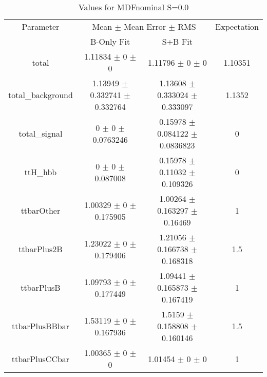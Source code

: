\begin{table}
\centering
\caption{Values for MDFnominal S=0.0}
\begin{tabular}{cccc}
\toprule
Parameter & \multicolumn{2}{c}{Mean $\pm$ Mean Error $\pm$ RMS} & Expectation\\
 & B-Only Fit & S+B Fit & \\
\midrule
total & \num{1.11834} $\pm$ \num{0} $\pm$ \num{0} & \num{1.11796} $\pm$ \num{0} $\pm$ \num{0} & \num{1.10351}\\
total\_background & \num{1.13949} $\pm$ \num{0.332741} $\pm$ \num{0.332764} & \num{1.13608} $\pm$ \num{0.333024} $\pm$ \num{0.333097} & \num{1.1352}\\
total\_signal & \num{0} $\pm$ \num{0} $\pm$ \num{0.0763246} & \num{0.15978} $\pm$ \num{0.084122} $\pm$ \num{0.0836823} & \num{0}\\
ttH\_hbb & \num{0} $\pm$ \num{0} $\pm$ \num{0.087008} & \num{0.15978} $\pm$ \num{0.11032} $\pm$ \num{0.109326} & \num{0}\\
ttbarOther & \num{1.00329} $\pm$ \num{0} $\pm$ \num{0.175905} & \num{1.00264} $\pm$ \num{0.163297} $\pm$ \num{0.16469} & \num{1}\\
ttbarPlus2B & \num{1.23022} $\pm$ \num{0} $\pm$ \num{0.179406} & \num{1.21056} $\pm$ \num{0.166738} $\pm$ \num{0.168318} & \num{1.5}\\
ttbarPlusB & \num{1.09793} $\pm$ \num{0} $\pm$ \num{0.177449} & \num{1.09441} $\pm$ \num{0.165873} $\pm$ \num{0.167419} & \num{1}\\
ttbarPlusBBbar & \num{1.53119} $\pm$ \num{0} $\pm$ \num{0.167936} & \num{1.5159} $\pm$ \num{0.158808} $\pm$ \num{0.160146} & \num{1.5}\\
ttbarPlusCCbar & \num{1.00365} $\pm$ \num{0} $\pm$ \num{0} & \num{1.01454} $\pm$ \num{0} $\pm$ \num{0} & \num{1}\\
\bottomrule
\end{tabular}
\end{table}
